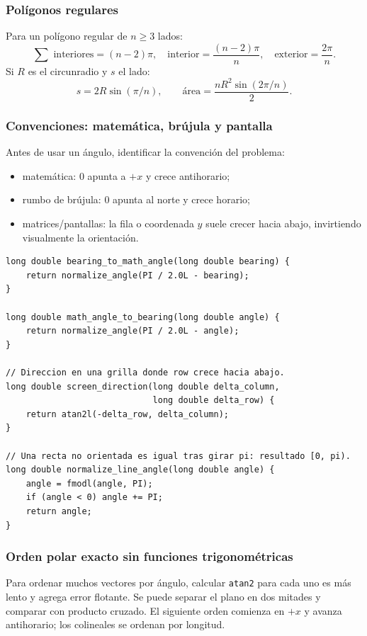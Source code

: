 \subsubsection{Pol\'igonos regulares}

Para un pol\'igono regular de $n\ge3$ lados:
\[
\sum\text{ interiores}=(n-2)\pi,\quad
\text{interior}=\frac{(n-2)\pi}{n},\quad
\text{exterior}=\frac{2\pi}{n}.
\]
Si $R$ es el circunradio y $s$ el lado:
\[
s=2R\sin(\pi/n),\qquad
\text{\'area}=\frac{nR^2\sin(2\pi/n)}2.
\]

\subsubsection{Convenciones: matem\'atica, br\'ujula y pantalla}

Antes de usar un \'angulo, identificar la convenci\'on del problema:
\begin{itemize}
  \item matem\'atica: $0$ apunta a $+x$ y crece antihorario;
  \item rumbo de br\'ujula: $0$ apunta al norte y crece horario;
  \item matrices/pantallas: la fila o coordenada $y$ suele crecer hacia abajo,
  invirtiendo visualmente la orientaci\'on.
\end{itemize}

\begin{lstlisting}[style=cpp]
long double bearing_to_math_angle(long double bearing) {
    return normalize_angle(PI / 2.0L - bearing);
}

long double math_angle_to_bearing(long double angle) {
    return normalize_angle(PI / 2.0L - angle);
}

// Direccion en una grilla donde row crece hacia abajo.
long double screen_direction(long double delta_column,
                             long double delta_row) {
    return atan2l(-delta_row, delta_column);
}

// Una recta no orientada es igual tras girar pi: resultado [0, pi).
long double normalize_line_angle(long double angle) {
    angle = fmodl(angle, PI);
    if (angle < 0) angle += PI;
    return angle;
}
\end{lstlisting}

\subsubsection{Orden polar exacto sin funciones trigonom\'etricas}

Para ordenar muchos vectores por \'angulo, calcular \texttt{atan2} para cada uno
es m\'as lento y agrega error flotante. Se puede separar el plano en dos mitades
y comparar con producto cruzado. El siguiente orden comienza en $+x$ y avanza
antihorario; los colineales se ordenan por longitud.

